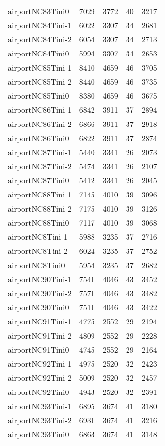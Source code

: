 \begin{longtable}{lrrrr}
airportNC83Tini0 & 7029 & 3772 & 40 & 3217 \\
airportNC84Tini-1 & 6022 & 3307 & 34 & 2681 \\
airportNC84Tini-2 & 6054 & 3307 & 34 & 2713 \\
airportNC84Tini0 & 5994 & 3307 & 34 & 2653 \\
airportNC85Tini-1 & 8410 & 4659 & 46 & 3705 \\
airportNC85Tini-2 & 8440 & 4659 & 46 & 3735 \\
airportNC85Tini0 & 8380 & 4659 & 46 & 3675 \\
airportNC86Tini-1 & 6842 & 3911 & 37 & 2894 \\
airportNC86Tini-2 & 6866 & 3911 & 37 & 2918 \\
airportNC86Tini0 & 6822 & 3911 & 37 & 2874 \\
airportNC87Tini-1 & 5440 & 3341 & 26 & 2073 \\
airportNC87Tini-2 & 5474 & 3341 & 26 & 2107 \\
airportNC87Tini0 & 5412 & 3341 & 26 & 2045 \\
airportNC88Tini-1 & 7145 & 4010 & 39 & 3096 \\
airportNC88Tini-2 & 7175 & 4010 & 39 & 3126 \\
airportNC88Tini0 & 7117 & 4010 & 39 & 3068 \\
airportNC8Tini-1 & 5988 & 3235 & 37 & 2716 \\
airportNC8Tini-2 & 6024 & 3235 & 37 & 2752 \\
airportNC8Tini0 & 5954 & 3235 & 37 & 2682 \\
airportNC90Tini-1 & 7541 & 4046 & 43 & 3452 \\
airportNC90Tini-2 & 7571 & 4046 & 43 & 3482 \\
airportNC90Tini0 & 7511 & 4046 & 43 & 3422 \\
airportNC91Tini-1 & 4775 & 2552 & 29 & 2194 \\
airportNC91Tini-2 & 4809 & 2552 & 29 & 2228 \\
airportNC91Tini0 & 4745 & 2552 & 29 & 2164 \\
airportNC92Tini-1 & 4975 & 2520 & 32 & 2423 \\
airportNC92Tini-2 & 5009 & 2520 & 32 & 2457 \\
airportNC92Tini0 & 4943 & 2520 & 32 & 2391 \\
airportNC93Tini-1 & 6895 & 3674 & 41 & 3180 \\
airportNC93Tini-2 & 6931 & 3674 & 41 & 3216 \\
airportNC93Tini0 & 6863 & 3674 & 41 & 3148 \\

\end{longtable}
